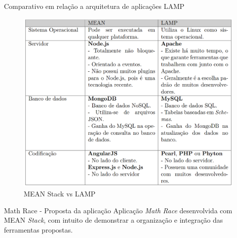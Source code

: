 \documentclass{beamer}
\newlength{\wideitemsep}
\let\olditem\item
\renewcommand{\item}{\setlength{\itemsep}{\wideitemsep}\olditem}
\begin{document}
\begin{frame}{Comparativo em relação a arquitetura de aplicações LAMP}
    \begin{figure}[htb]
    \centering
    \includegraphics[scale=0.26]{../images/mean_lamp.png}
    \caption{MEAN Stack vs LAMP}
    \label{fig: mean_lamp}
    \end{figure}
\end{frame}

\begin{frame}{Math Race - Proposta da aplicação}
    Aplicação \textit{Math Race} desenvolvida com MEAN \textit{Stack}, com intuito de demonstrar a organização e integração das ferramentas propostas.
\end{frame}

\end{document}
